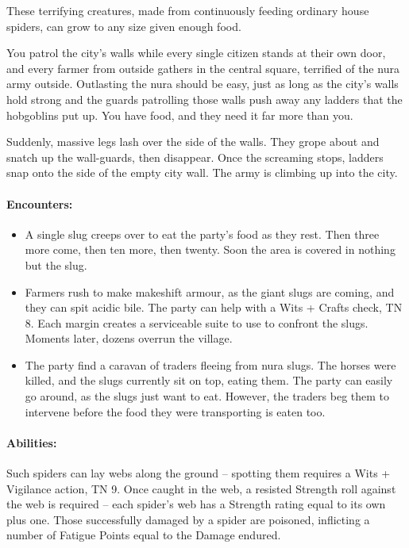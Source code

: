 \begin{multicols}{2}
These terrifying creatures, made from continuously feeding ordinary house spiders, can grow to any size given enough food.

\begin{boxtext}

  You patrol the city's walls while every single citizen stands at their own door, and every farmer from outside gathers in the central square, terrified of the nura army outside.
  Outlasting the nura should be easy, just as long as the city's walls hold strong and the guards patrolling those walls push away any ladders that the hobgoblins put up.
  You have food, and they need it far more than you.

  Suddenly, massive legs lash over the side of the walls.
  They grope about and snatch up the wall-guards, then disappear.
  Once the screaming stops, ladders snap onto the side of the empty city wall.
  The army is climbing up into the city.

\end{boxtext}

\paragraph{Encounters:}

\begin{itemize}

  \item
  A single slug creeps over to eat the party's food as they rest.
  Then three more come, then ten more, then twenty.
  Soon the area is covered in nothing but the slug.
  \item
  Farmers rush to make makeshift armour, as the giant slugs are coming, and they can spit acidic bile.
  The party can help with a Wits + Crafts check, TN 8.
  Each margin creates a serviceable suite to use to confront the slugs.
  Moments later, dozens overrun the village.
  \item
  The party find a caravan of traders fleeing from nura slugs.
  The horses were killed, and the slugs currently sit on top, eating them.
  The party can easily go around, as the slugs just want to eat.
  However, the traders beg them to intervene before the food they were transporting is eaten too.

\end{itemize}

\nuraspider

\paragraph{Abilities:} Such spiders can lay webs along the ground -- spotting them requires a Wits + Vigilance action, TN 9.
Once caught in the web, a resisted Strength roll against the web is required -- each spider's web has a Strength rating equal to its own plus one.
Those successfully damaged by a spider are poisoned, inflicting a number of Fatigue Points equal to the Damage endured.


\end{multicols}
